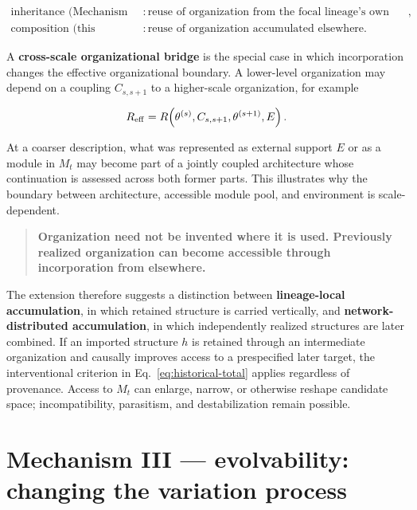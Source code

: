 \documentclass[11pt,a4paper]{article}
\begin{document}
\begin{equation*}
\boxed{
\begin{aligned}
\text{inheritance (Mechanism II)} &: \text{reuse of organization from the focal lineage's own history},\\
\text{composition (this section)} &: \text{reuse of organization accumulated elsewhere}.
\end{aligned}
}
\end{equation*}

A \textbf{cross-scale organizational bridge} is the special case in which incorporation changes the effective organizational boundary. A lower-level organization may depend on a coupling $C_{s,s+1}$ to a higher-scale organization, for example

\begin{equation*}
R_{\rm eff}=R\!\left(\theta^{(s)},C_{s,s+1},\theta^{(s+1)},E\right).
\end{equation*}

At a coarser description, what was represented as external support $E$ or as a module in $M_t$ may become part of a jointly coupled architecture whose continuation is assessed across both former parts. This illustrates why the boundary between architecture, accessible module pool, and environment is scale-dependent.

\begin{quote}
\textbf{Organization need not be invented where it is used. Previously realized organization can become accessible through incorporation from elsewhere.}
\end{quote}

The extension therefore suggests a distinction between \textbf{lineage-local accumulation}, in which retained structure is carried vertically, and \textbf{network-distributed accumulation}, in which independently realized structures are later combined. If an imported structure $h$ is retained through an intermediate organization and causally improves access to a prespecified later target, the interventional criterion in Eq.~\eqref{eq:historical-total} applies regardless of provenance. Access to $M_t$ can enlarge, narrow, or otherwise reshape candidate space; incompatibility, parasitism, and destabilization remain possible.

\section{Mechanism III --- evolvability: changing the variation process}
\end{document}

